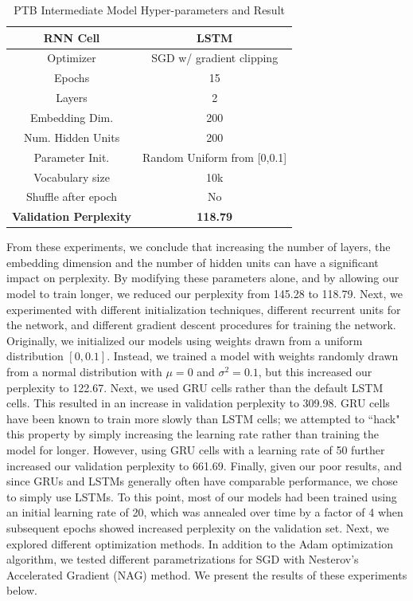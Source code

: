 \documentclass[a4paper]{article}
\begin{document}
\begin{table}[h!]
\centering
\begin{tabular}{|c | c|} 
 \hline
RNN Cell & LSTM\\ \hline
Optimizer & SGD w/ gradient clipping \\ \hline
Epochs & 15\\ \hline
Layers & 2\\ \hline
Embedding Dim. & 200\\ \hline
Num. Hidden Units & 200\\ \hline
Parameter Init. & Random Uniform from [0,0.1]\\ \hline
Vocabulary size & 10k\\ \hline
Shuffle after epoch & No \\ \hline
\textbf{Validation Perplexity} &\textbf{118.79} \\ \hline
\end{tabular}
\caption{PTB Intermediate Model Hyper-parameters and Result}
\label{table:1}
\end{table}

From these experiments, we conclude that increasing the number of layers, the embedding dimension and the number of hidden units can have a significant impact on perplexity. By modifying these parameters alone, and by allowing our model to train longer, we reduced our perplexity from 145.28 to 118.79.
\newline
\newline
Next, we experimented with different initialization techniques, different recurrent units for the network, and different gradient descent procedures for training the network. Originally, we initialized our models using weights drawn from a uniform distribution $[0,0.1]$. Instead, we trained a model with weights randomly drawn from a normal distribution with $\mu=0$ and $\sigma^2 = 0.1$, but this increased our perplexity to 122.67.
\newline
\newline
Next, we used GRU cells rather than the default LSTM cells. This resulted in an increase in validation perplexity to 309.98. GRU cells have been known to train more slowly than LSTM cells; we attempted to ``hack" this property by simply increasing the learning rate rather than training the model for longer. However, using GRU cells with a learning rate of 50 further increased our validation perplexity to 661.69. Finally, given our poor results, and since GRUs and LSTMs generally often have comparable performance, we chose to simply use LSTMs.
\newline
\newline
To this point, most of our models had been trained using an initial learning rate of 20, which was annealed over time by a factor of 4 when subsequent epochs showed increased perplexity on the validation set. Next, we explored different optimization methods. In addition to the Adam optimization algorithm, we tested different parametrizations for SGD with Nesterov's Accelerated Gradient (NAG) method. We present the results of these experiments below.
\end{document}
